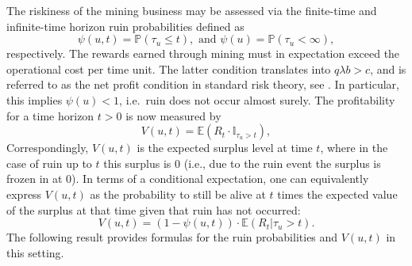 The riskiness of the mining business may be assessed via the finite-time and infinite-time horizon ruin probabilities defined as 
\begin{equation}\label{eq:ruin_probabilities}
\psi(u,t) = \mathbb{P}(\tau_u\leq t),\text{ and }\psi(u)=\mathbb{P}(\tau_u<\infty), 
\end{equation}
respectively. The rewards earned through mining must in expectation exceed the operational cost per time unit. The latter condition translates into $q\lambda b > c$, and is referred to as the net profit condition in standard risk theory, see \citet{Asmussen_2010}. In particular, this implies $\psi(u)<1$, i.e.\ ruin does not occur almost surely. The profitability for a time horizon $t>0$ is now measured by
\begin{equation}\label{eq:value_function_finite_time}
V(u,t) = \mathbb{E}(R_t\cdot \mathbb{I}_{\tau_u>t}),
\end{equation}
Correspondingly, $V(u,t)$ is the expected surplus level at time $t$, where in the case of ruin up to $t$ this surplus is $0$ (i.e., due to the ruin event the surplus is frozen in at $0$). In terms of a conditional expectation, one can equivalently express $V(u,t)$ as the probability to still be alive at $t$ times the expected value of the surplus at that time given that ruin has not occurred:
\[V(u,t)= (1-\psi(u,t))\cdot \mathbb{E}(R_t\vert {\tau_u>t}).\]
 The following result provides formulas for the ruin probabilities and $V(u,t)$ in this setting.

